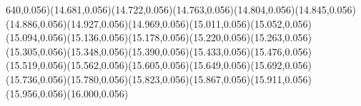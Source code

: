 \documentclass[smallextended]{svjour3}
\begin{document}
640,0.056)(14.681,0.056)(14.722,0.056)(14.763,0.056)(14.804,0.056)(14.845,0.056)(14.886,0.056)(14.927,0.056)(14.969,0.056)(15.011,0.056)(15.052,0.056)(15.094,0.056)(15.136,0.056)(15.178,0.056)(15.220,0.056)(15.263,0.056)(15.305,0.056)(15.348,0.056)(15.390,0.056)(15.433,0.056)(15.476,0.056)(15.519,0.056)(15.562,0.056)(15.605,0.056)(15.649,0.056)(15.692,0.056)(15.736,0.056)(15.780,0.056)(15.823,0.056)(15.867,0.056)(15.911,0.056)(15.956,0.056)(16.000,0.056)



\end{document}

